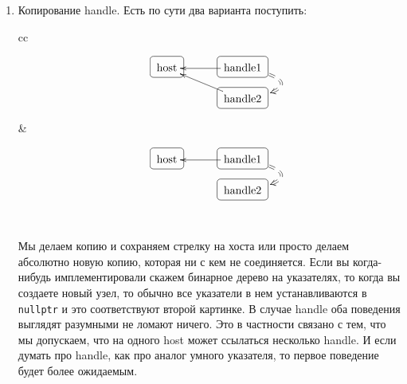 \begin{enumerate}
\item Копирование handle.
Есть по сути два варианта поступить:
\begin{center}
\begin{tabular}{cc}
{
\begin{minipage}[\baselineskip]{5.5cm}
\[
\xymatrix@R=15pt@C=15pt{
  {\text{host}}
      	{
	\save
   [].[]*+[F-:<3pt>]\frm{}
   \restore
	}
  &{}&{\text{handle1}}\ar[ll]\ar@{==>}@/^30pt/[d]<5pt>
    	{
	\save
   [].[]*+[F-:<3pt>]\frm{}
   \restore
	}
  \\
  {}
  &{}&{\text{handle2}}\ar[llu]
    	{
	\save
   [].[]*+[F-:<3pt>]\frm{}
   \restore
	}
  \\ 
}
\]
\end{minipage}
}&{
\begin{minipage}[\baselineskip]{5.5cm}
\[
\xymatrix@R=15pt@C=15pt{
  {\text{host}}
      	{
	\save
   [].[]*+[F-:<3pt>]\frm{}
   \restore
	}
  &{}&{\text{handle1}}\ar[ll]\ar@{==>}@/^30pt/[d]<5pt>
    	{
	\save
   [].[]*+[F-:<3pt>]\frm{}
   \restore
	}
  \\ 
  {}
  &{}&{\text{handle2}}
    	{
	\save
   [].[]*+[F-:<3pt>]\frm{}
   \restore
	}
  \\ 
}
\]
\end{minipage}
}\\
\end{tabular}
\end{center}
Мы делаем копию и сохраняем стрелку на хоста или просто делаем абсолютно новую копию, которая ни с кем не соединяется.
Если вы когда-нибудь имплементировали скажем бинарное дерево на указателях, то когда вы создаете новый узел, то обычно все указатели в нем устанавливаются в \verb"nullptr" и это соответствуют второй картинке.
В случае handle оба поведения выглядят разумными не ломают ничего.
Это в частности связано с тем, что мы допускаем, что на одного host может ссылаться несколько handle.
И если думать про handle, как про аналог умного указателя, то первое поведение будет более ожидаемым.


\end{enumerate}
